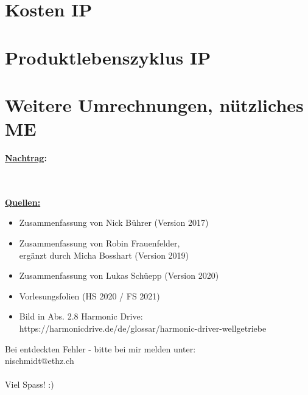 \documentclass[numerate]{cheatsheet}
\begin{document}
\section{Kosten \hfill IP}
    
    
    
    
    
    

\section{Produktlebenszyklus \hfill IP}
    

\section{Weitere Umrechnungen, nützliches \hfill ME}
    
    
    \newpage
    \par \vspace{2mm} \huge{\textbf{\underline{Nachtrag}:}}
    \\ \vspace{2mm} \begin{footnotesize}
        \\~\\\textbf{\underline{Quellen:}}
        \begin{itemize}
            \item Zusammenfassung von Nick Bührer (Version 2017)
            \item Zusammenfassung von Robin Frauenfelder, \\ergänzt durch Micha Bosshart (Version 2019)
            \item Zusammenfassung von Lukas Schüepp (Version 2020)
            \item Vorlesungsfolien (HS 2020 / FS 2021)
            \item Bild in Abs. 2.8 Harmonic Drive: 
            \\https://harmonicdrive.de/de/glossar/harmonic-driver-wellgetriebe
        \end{itemize}

        \vspace{5mm}
        Bei entdeckten Fehler - bitte bei mir melden unter:
        \\nischmidt$@$ethz.ch
        \\~\\ \vspace{3mm} Viel Spass! :)

    \end{footnotesize}
\end{document}
